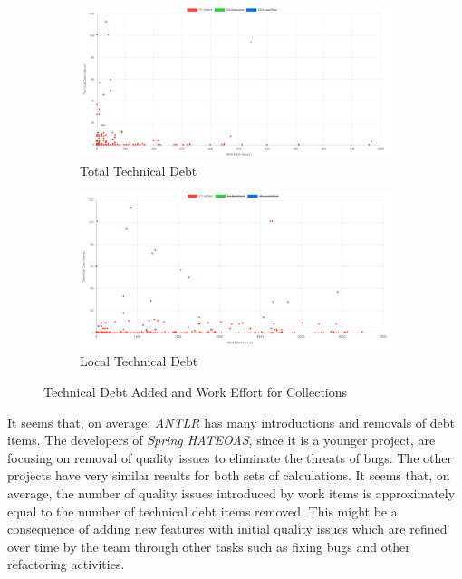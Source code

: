\documentclass{mpaper}
\begin{document}
\begin{figure}
	\centering
	\begin{subfigure}{.45\textwidth}
		\includegraphics[width=\linewidth]{images/collections_added_debt_commit.png}
		\caption{Total Technical Debt}
		\label{fig:td-added-commit}
	\end{subfigure}
	\begin{subfigure}{.45\textwidth}
		\includegraphics[width=\linewidth]{images/collections_added_debt_ticket.png}
		\caption{Local Technical Debt}
		\label{fig:td-added-ticket}
	\end{subfigure}
	\caption{Technical Debt Added and Work Effort for Collections}
	\label{fig:td-added}
\end{figure}


It seems that, on average, \emph{ANTLR} has many introductions and removals of
debt items. The developers of \emph{Spring HATEOAS}, since it is a younger
project, are focusing on removal of quality issues to eliminate the threats of
bugs. The other projects have very similar results for both sets of
calculations. It seems that, on average, the number of quality issues introduced
by work items is approximately equal to the number of technical debt items
removed. This might be a consequence of adding new features with initial quality
issues which are refined over time by the team through other tasks such as
fixing bugs and other refactoring activities.
\end{document}
